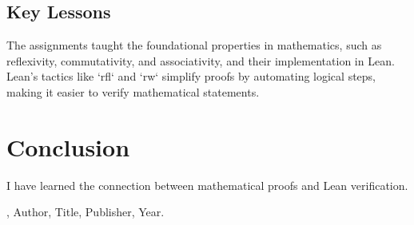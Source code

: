 \documentclass{article}
\theoremstyle{theorem}
\theoremstyle{definition}
\theoremstyle{remark}
\begin{document}
\subsection{Key Lessons}

The assignments taught the foundational properties in mathematics, such as reflexivity, commutativity, and associativity, and their implementation in Lean. Lean's tactics like `rfl` and `rw` simplify proofs by automating logical steps, making it easier to verify mathematical statements. 

\section{Conclusion}\label{conclusion}

I have learned the connection between mathematical proofs and Lean verification. 

\begin{thebibliography}{99}
\bibitem[BLA], Author, Title, Publisher, Year.
\end{thebibliography}
\end{document}
